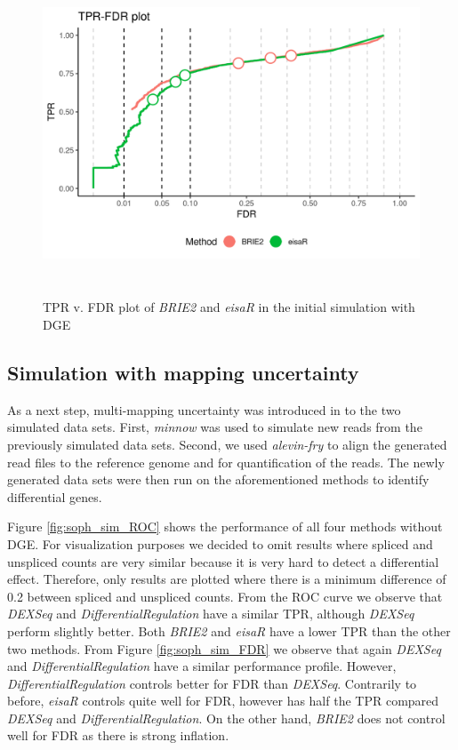 \begin{figure}[!htb]
\begin{center}
\includegraphics[width=6in,height=3.8in]{../figures/simulation/naive_simulation_DGE_FDR.png}
\end{center}
\caption{TPR v. FDR plot of \emph{BRIE2} and \emph{eisaR} in the initial simulation with DGE}
\label{fig:naive_sim_DGE_FDR}
\end{figure}
\FloatBarrier

\subsection{Simulation with mapping uncertainty} \label{soph_sim}
As a next step, multi-mapping uncertainty was introduced in to the two simulated data sets. First, \emph{minnow} was used to simulate new reads from the previously simulated data sets. Second, we used \emph{alevin-fry} to align the generated read files to the reference genome and for quantification of the reads. The newly generated data sets were then run on the aforementioned methods to identify differential genes. 

Figure \ref{fig:soph_sim_ROC} shows the performance of all four methods without DGE. For visualization purposes we decided to omit results where spliced and unspliced counts are very similar because it is very hard to detect a differential effect. Therefore, only results are plotted where there is a minimum difference of 0.2 between spliced and unspliced counts. From the ROC curve we observe that \emph{DEXSeq} and \emph{DifferentialRegulation} have a similar TPR, although \emph{DEXSeq} perform slightly better. Both \emph{BRIE2} and \emph{eisaR} have a lower TPR than the other two methods. From Figure \ref{fig:soph_sim_FDR} we observe that again \emph{DEXSeq} and \emph{DifferentialRegulation} have a similar performance profile. However, \emph{DifferentialRegulation} controls better for FDR than \emph{DEXSeq}. Contrarily to before, \emph{eisaR} controls quite well for FDR, however has half the TPR compared \emph{DEXSeq} and \emph{DifferentialRegulation}. On the other hand, \emph{BRIE2} does not control well for FDR as there is strong inflation.

